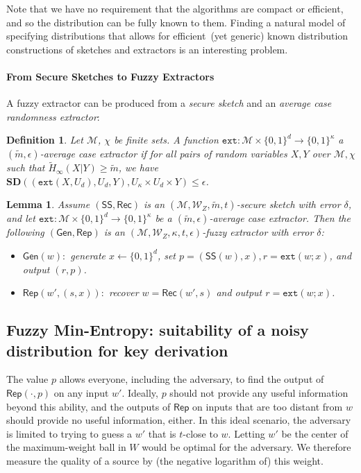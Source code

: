\documentclass[11pt]{article}
\newcommand{\class}[1]{{\ensuremath{\mathsf{#1}}}}
\newcommand{\gen}{\ensuremath{\class{Gen}}\xspace}
\newcommand{\rep}{\ensuremath{\class{Rep}}\xspace}
\newcommand{\sketch}{\ensuremath{\class{SS}}\xspace}
\newcommand{\rec}{\ensuremath{\class{Rec}}\xspace}
\newcommand{\zo}{\ensuremath{\{0, 1\}}}
\newcommand{\ext}{\ensuremath{\mathtt{ext}}}
\newcommand{\sd}{\ensuremath{\mathbf{SD}}}
\newtheorem{lemma}[theorem]{Lemma}
\newtheorem{definition}[theorem]{Definition}
\begin{document}
Note that we have no requirement that the algorithms are compact or efficient, and so the distribution can be fully known to them. Finding a natural model of specifying distributions that allows for efficient~(yet generic) known distribution constructions of sketches and extractors is an interesting problem.  

\paragraph{From Secure Sketches to Fuzzy Extractors}
A fuzzy extractor can be produced from a \emph{secure sketch} and an \emph{average case randomness extractor}:

\begin{definition}
Let $\mathcal{M}$, $\chi$ be finite sets.
A function $\ext: \mathcal{M}\times \{0,1\}^d \rightarrow \{0,1\}^\kappa$ a \emph{$(\tilde{m}, \epsilon)$-average case extractor} if for all pairs
of random variables $X, Y$ over $\mathcal{M}, \chi$ such that
$\tilde{H}_\infty(X|Y) \ge \tilde{m}$, we have $\sd((\ext(X, U_d), U_d, Y), U_\kappa\times
U_d \times Y) \le \epsilon$.
\end{definition}

\begin{lemma}
\label{lem:fuzzy ext construction}
Assume $(\sketch, \rec)$ is an $(\mathcal{M}, \mathcal{W}_Z, \tilde{m}, t)$-secure sketch with error $\delta$, and let $\ext:\mathcal{M}\times \zo^d \rightarrow \zo^\kappa$ be a $(\tilde{m}, \epsilon)$-average case extractor.  Then the following $(\gen, \rep)$ is an $(\mathcal{M}, \mathcal{W}_Z, \kappa, t, \epsilon)$-fuzzy extractor with error $\delta$:
\begin{itemize}
\item $\gen(w):$ generate $x\leftarrow \zo^d$, set $p=(\sketch(w), x), r=\ext(w;x)$, and output $(r,p)$.
\item $\rep(w', (s, x)):$ recover $w=\rec(w',s)$ and output $r=\ext(w;x)$.
\end{itemize}
\end{lemma}

\subsection{Fuzzy Min-Entropy: suitability of a noisy distribution for key derivation}
\label{sec:minimal conditions}
The value $p$ allows everyone, including the adversary, to find the output of $\rep(\cdot, p)$ on any input $w'$. Ideally,  $p$ should not provide any useful information beyond this ability, and the outputs of $\rep$ on inputs that are too distant from $w$ should provide no useful information, either.  In this ideal scenario, the adversary is limited to trying to guess a $w'$ that is $t$-close to $w$. 
Letting $w'$ be the center of the maximum-weight ball in $W$ would be optimal for the adversary.
We therefore measure the quality of a source by (the negative logarithm of) this weight.  
\end{document}

